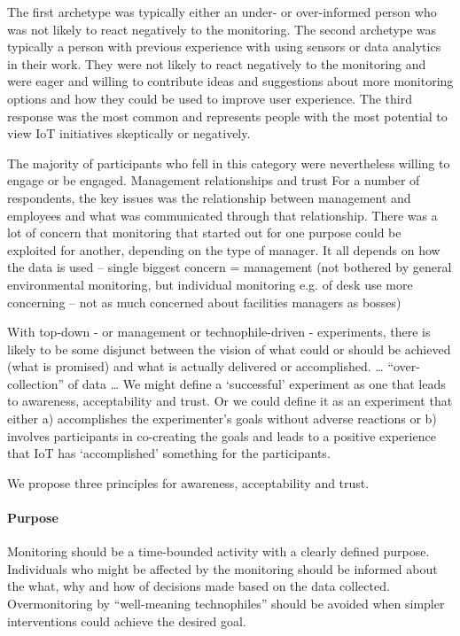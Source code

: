 The first archetype was typically either an under- or over-informed
person who was not likely to react negatively to the monitoring. The
second archetype was typically a person with previous experience with
using sensors or data analytics in their work. They were not likely to
react negatively to the monitoring and were eager and willing to
contribute ideas and suggestions about more monitoring options and how
they could be used to improve user experience. The third response was
the most common and represents people with the most potential to view
IoT initiatives skeptically or negatively. 

The majority of participants who fell in this category were
nevertheless willing to engage or be engaged.  Management
relationships and trust For a number of respondents, the key issues
was the relationship between management and employees and what was
communicated through that relationship. There was a lot of concern
that monitoring that started out for one purpose could be exploited
for another, depending on the type of manager.  It all depends on how
the data is used – single biggest concern = management (not bothered
by general environmental monitoring, but individual monitoring e.g. of
desk use more concerning – not as much concerned about facilities
managers as bosses) 




With top-down - or management or technophile-driven - experiments,
there is likely to be some disjunct between the vision of what could
or should be achieved (what is promised) and what is actually
delivered or accomplished. … “over-collection” of data 
…
We might define a ‘successful’ experiment as one that leads to
awareness, acceptability and trust. Or we could define it as an
experiment that either a) accomplishes the experimenter’s goals
without adverse reactions or b) involves participants in co-creating
the goals and leads to a positive experience that IoT has
‘accomplished’ something for the participants.  

We propose three principles for awareness, acceptability and trust.

\paragraph{Purpose} Monitoring should be a time-bounded activity with
a clearly defined purpose. Individuals who might be affected by the
monitoring should be informed about the what, why and how of decisions
made based on the data collected. Overmonitoring by “well-meaning
technophiles” should be avoided when simpler interventions could
achieve the desired goal. 

